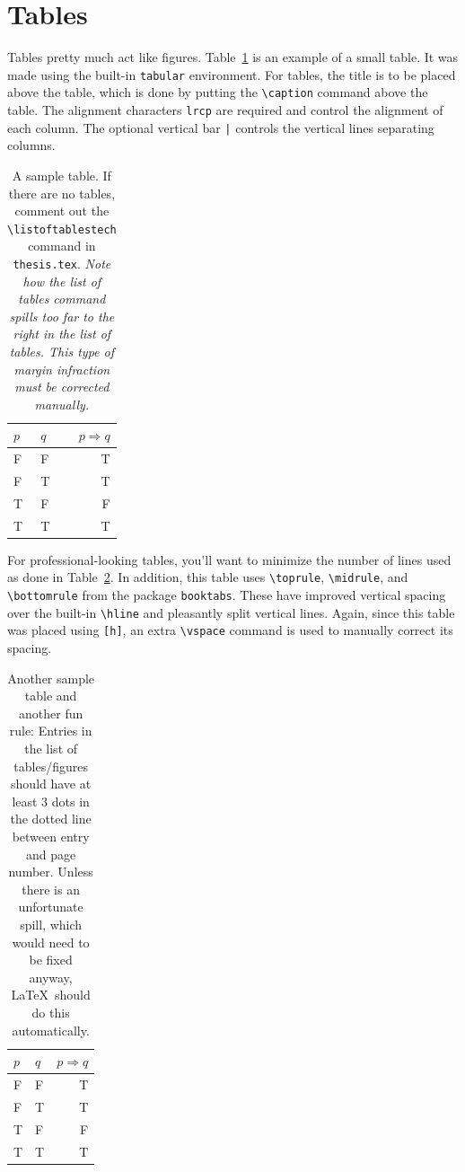 \section{Tables}

Tables pretty much act like figures.
Table~\ref{tab:ugly if} is an example of a small table.
It was made using the built-in \verb+tabular+ environment.
For tables, the title is to be placed above the table, which is done by putting the \verb+\caption+ command above the table.
The alignment characters \verb+lrcp+ are required and control the alignment of each column.
The optional vertical bar \verb+|+ controls the vertical lines separating columns.

\begin{table}[b]
	\cprotect\caption{A sample table.
		If there are no tables, comment out the \verb+\listoftablestech+ command in \verb+thesis.tex+.
		\emph{Note how the list of tables command spills too far to the right in the list of tables.
		This type of margin infraction must be corrected manually.}
	}
	\label{tab:ugly if}
	\centering
	\begin{tabular}{|l|l|r|}
		\hline
		$p$ & $q$ & $p\Rightarrow q$ \\
		\hline
		F   & F   & T \\
		\hline
		F   & T   & T \\
		\hline
		T   & F   & F \\
		\hline
		T   & T   & T \\
		\hline
	\end{tabular}
\end{table}

For professional-looking tables, you'll want to minimize the number of lines used as done in Table~\ref{tab:pretty if}.
In addition, this table uses \verb+\toprule+, \verb+\midrule+, and \verb+\bottomrule+ from the package \verb+booktabs+.
These have improved vertical spacing over the built-in \verb+\hline+ and pleasantly split vertical lines.
Again, since this table was placed using \verb+[h]+, an extra \verb+\vspace+ command is used to manually correct its spacing.

\begin{table}[h]
	\caption{
		Another sample table and another fun rule:
		Entries in the list of tables/figures should have at least 3 dots in the dotted line between entry and page number.
		Unless there is an unfortunate spill, which would need to be fixed anyway,	\LaTeX\ should do this automatically.}
	\label{tab:pretty if}
	\centering
	\begin{tabular}{l l | r}
		\toprule
		$p$ & $q$ & $p\Rightarrow q$ \\
		\midrule
		F   & F   & T \\
		F   & T   & T \\
		T   & F   & F \\
		T   & T   & T \\
		\bottomrule
	\end{tabular}
	\vspace{-\baselineskip}
\end{table}

